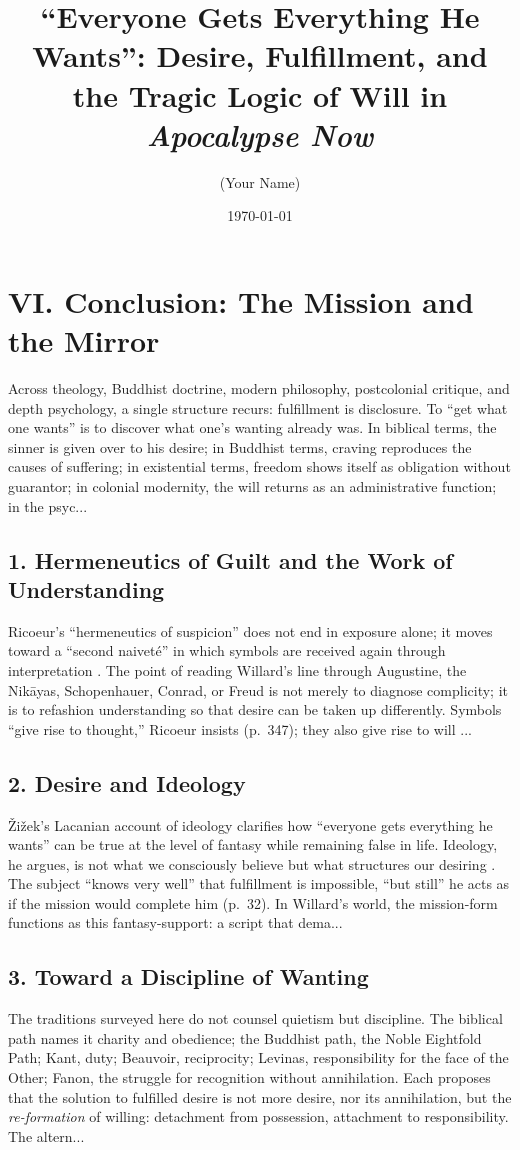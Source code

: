 \documentclass[12pt]{article}
\title{“Everyone Gets Everything He Wants”: Desire, Fulfillment, and the Tragic Logic of Will in \textit{Apocalypse Now}}
\author{(Your Name)}
\date{\today}
\begin{document}
\maketitle

\section*{VI. Conclusion: The Mission and the Mirror}

Across theology, Buddhist doctrine, modern philosophy, postcolonial critique, and depth psychology, a single structure recurs: fulfillment is disclosure. To ``get what one wants'' is to discover what one’s wanting already was. In biblical terms, the sinner is given over to his desire; in Buddhist terms, craving reproduces the causes of suffering; in existential terms, freedom shows itself as obligation without guarantor; in colonial modernity, the will returns as an administrative function; in the psyc...
\subsection*{1. Hermeneutics of Guilt and the Work of Understanding}
Ricoeur’s ``hermeneutics of suspicion'' does not end in exposure alone; it moves toward a ``second naivet{\'e}'' in which symbols are received again through interpretation \parencite{RicoeurSymbol1970}. The point of reading Willard’s line through Augustine, the Nik{\={a}}yas, Schopenhauer, Conrad, or Freud is not merely to diagnose complicity; it is to refashion understanding so that desire can be taken up differently. Symbols ``give rise to thought,'' Ricoeur insists (p.~347); they also give rise to will ...
\subsection*{2. Desire and Ideology}
{\v{Z}}i{\v{z}}ek’s Lacanian account of ideology clarifies how ``everyone gets everything he wants'' can be true at the level of fantasy while remaining false in life. Ideology, he argues, is not what we consciously believe but what structures our desiring \parencite{ZizekSublime1999}. The subject ``knows very well'' that fulfillment is impossible, ``but still'' he acts as if the mission would complete him (p.~32). In Willard’s world, the mission-form functions as this fantasy-support: a script that dema...
\subsection*{3. Toward a Discipline of Wanting}
The traditions surveyed here do not counsel quietism but discipline. The biblical path names it charity and obedience; the Buddhist path, the Noble Eightfold Path; Kant, duty; Beauvoir, reciprocity; Levinas, responsibility for the face of the Other; Fanon, the struggle for recognition without annihilation. Each proposes that the solution to fulfilled desire is not more desire, nor its annihilation, but the \emph{re-formation} of willing: detachment from possession, attachment to responsibility. The altern...
\end{document}
